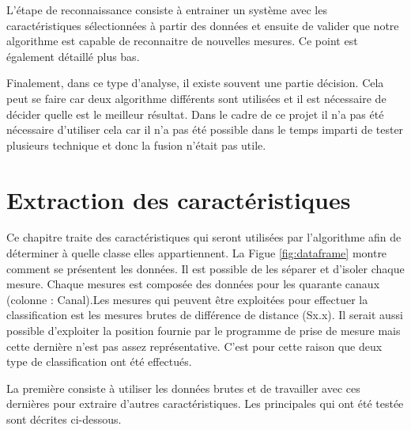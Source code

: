 L'étape de reconnaissance consiste à entrainer un système avec les caractéristiques sélectionnées à partir des données et ensuite de valider que notre algorithme est capable de reconnaitre de nouvelles mesures. Ce point est également détaillé plus bas. 

Finalement, dans ce type d'analyse, il existe souvent une partie décision. Cela peut se faire car deux algorithme différents sont utilisées et il est nécessaire de décider quelle est le meilleur résultat. Dans le cadre de ce projet il n'a pas été nécessaire d'utiliser cela car il n'a pas été possible dans le temps imparti de tester plusieurs technique et donc la fusion n'était pas utile.

\section{Extraction des caractéristiques}
Ce chapitre traite des caractéristiques qui seront utilisées par l'algorithme afin de déterminer à quelle classe elles appartiennent. La Figue \ref{fig:dataframe} montre comment se présentent les données. Il est possible de les séparer et d'isoler chaque mesure. Chaque mesures est composée des données pour les quarante canaux (colonne : Canal).Les mesures qui peuvent être exploitées pour effectuer la classification est les mesures brutes de différence de distance (Sx.x). Il serait aussi possible d'exploiter la position fournie par le programme de prise de mesure mais cette dernière n'est pas assez représentative. C'est pour cette raison que deux type de classification ont été effectués. 

La première consiste à utiliser les données brutes et de travailler avec ces dernières pour extraire d'autres caractéristiques. Les principales qui ont été testée sont décrites ci-dessous.

